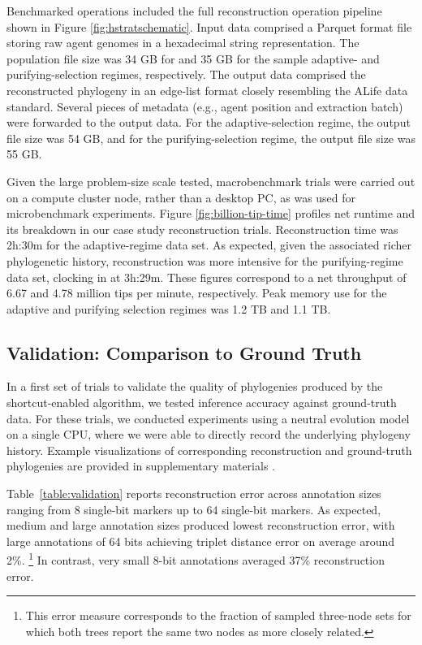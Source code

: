 Benchmarked operations included the full reconstruction operation pipeline shown in Figure \ref{fig:hstratschematic}.
Input data comprised a Parquet format file storing raw agent genomes in a hexadecimal string representation.
The population file size was 34 GB for and 35 GB for the sample adaptive- and purifying-selection regimes, respectively.
The output data comprised the reconstructed phylogeny in an edge-list format closely resembling the ALife data standard.
Several pieces of metadata (e.g., agent position and extraction batch) were forwarded to the output data.
For the adaptive-selection regime, the output file size was 54 GB, and for the purifying-selection regime, the output file size was 55 GB.

Given the large problem-size scale tested, macrobenchmark trials were carried out on a compute cluster node, rather than a desktop PC, as was used for microbenchmark experiments.
Figure \ref{fig:billion-tip-time} profiles net runtime and its breakdown in our case study reconstruction trials.
Reconstruction time was 2h:30m for the adaptive-regime data set.
As expected, given the associated richer phylogenetic history, reconstruction was more intensive for the purifying-regime data set, clocking in at 3h:29m.
These figures correspond to a net throughput of 6.67 and 4.78 million tips per minute, respectively.
Peak memory use for the adaptive and purifying selection regimes was 1.2 TB and 1.1 TB.

\subsection{Validation: Comparison to Ground Truth}

In a first set of trials to validate the quality of phylogenies produced by the shortcut-enabled algorithm, we tested inference accuracy against ground-truth data.
For these trials, we conducted experiments using a neutral evolution model on a single CPU, where we were able to directly record the underlying phylogeny history.
Example visualizations of corresponding reconstruction and ground-truth phylogenies are provided in supplementary materials \citep{supplemental}.



Table~\ref{table:validation} reports reconstruction error across annotation sizes ranging from 8 single-bit markers up to 64 single-bit markers.
As expected, medium and large annotation sizes produced lowest reconstruction error, with large annotations of 64 bits achieving triplet distance error on average around 2\%.%
\footnote{This error measure corresponds to the fraction of sampled three-node sets for which both trees report the same two nodes as more closely related.}
In contrast, very small 8-bit annotations averaged 37\% reconstruction error.

